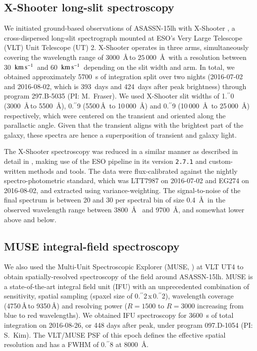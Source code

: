 \documentclass[traditabstract]{aa}
\newcommand{\farc}{\hbox{$.\!\!^{\prime\prime}$}}
\newcommand{\kms}{$\rm{km\,s^{-1}}$}
\begin{document}

\subsection{X-Shooter long-slit spectroscopy}
\label{obs:xs}

We initiated ground-based observations of ASASSN-15lh with X-Shooter \citep{2011A&A...536A.105V}, a cross-dispersed long-slit spectrograph mounted at ESO's Very Large Telescope (VLT) Unit Telescope (UT) 2. X-Shooter operates in three arms, simultaneously covering the wavelength range of $3000$~\AA\,to $25\,000$~\AA\, with a resolution between 30~\kms\, and 60~\kms\, depending on the slit width and arm. In total, we obtained approximately 5700~s of integration split over two nights (2016-07-02 and 2016-08-02, which is 393~days and 424~days after peak brightness) through program 297.B-5035 (PI: M.~Fraser). We used X-Shooter slit widths of 1\farc{0} (3000~\AA\,to 5500~\AA), 0\farc{9} (5500\,\AA~to 10\,000~\AA) and  0\farc{9} (10\,000~\AA\ to 25\,000~\AA) respectively, which were centered on the transient and oriented along the parallactic angle. Given that the transient aligns with the brightest part of the galaxy, these spectra are hence a superposition of transient and galaxy light.

The X-Shooter spectroscopy was reduced in a similar manner as described in detail in \citet{2015A&A...581A.125K}, making use of the ESO pipeline in its version \texttt{2.7.1} \citep{2006SPIE.6269E..80G, 2010SPIE.7737E..56M} and custom-written methods and tools. The data were flux-calibrated against the nightly spectro-photometric standard, which was LTT7987 on 2016-07-02 and EG274 on 2016-08-02, and extracted using variance-weighting. The signal-to-noise of the final spectrum is between 20 and 30 per spectral bin of size 0.4~\AA~in the observed wavelength range between 3800~\AA~ and 9700~\AA, and somewhat lower above and below.

\subsection{MUSE integral-field spectroscopy}
\label{obs:muse}

We also used the Multi-Unit Spectroscopic Explorer (MUSE, \citealt{2010SPIE.7735E..08B}) at VLT UT4 to obtain spatially-resolved spectroscopy of the field around ASASSN-15lh. MUSE is a state-of-the-art integral field unit (IFU) with an unprecedented combination of sensitivity, spatial sampling (spaxel size of 0\farc{2}\,x\,0\farc{2}), wavelength coverage (4750\,\AA\,to 9350\,\AA) and resolving power ($R=1500$ to $R=3000$ increasing from blue to red wavelengths). We obtained IFU spectroscopy for 3600~s  of total integration on 2016-08-26, or 448 days after peak, under program 097.D-1054 (PI: S.~Kim). The VLT/MUSE PSF of this epoch defines the effective spatial resolution and has a FWHM of 0\farc{8} at 8000~\AA. 
\end{document}
